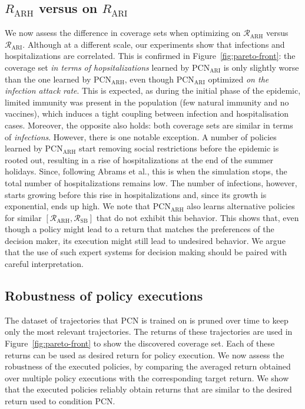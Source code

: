\documentclass{article}
\newcommand{\mdprewardfn}{\mathcal{R}}
\begin{document}
\subsection{$R_\text{ARH}$ versus on $R_\text{ARI}$}
\label{sec:arh-vs-ari}

We now assess the difference in coverage sets when optimizing on $\mdprewardfn_\text{ARH}$ versus $\mdprewardfn_\text{ARI}$. Although at a different scale, our experiments show that infections and hospitalizations are correlated. This is confirmed in Figure~\ref{fig:pareto-front}: the coverage set \emph{in terms of hopsitalizations} learned by $\text{PCN}_\text{ARI}$ is only slightly worse than the one learned by $\text{PCN}_\text{ARH}$, even though $\text{PCN}_\text{ARI}$ optimized \emph{on the infection attack rate}. This is expected, as during the initial phase of the epidemic, limited immunity was present in the population (few natural immunity and no vaccines), which induces a tight coupling between infection and hospitalisation cases. Moreover, the opposite also holds: both coverage sets are similar in terms of \emph{infections}. However, there is one notable exception. A number of policies learned by $\text{PCN}_\text{ARH}$ start removing social restrictions before the epidemic is rooted out, resulting in a rise of hospitalizations at the end of the summer holidays. Since, following Abrams et al., this is when the simulation stops, the total number of hospitalizations remains low. The number of infections, however, starts growing before this rise in hospitalizations and, since its growth is exponential, ends up high. We note that $\text{PCN}_\text{ARH}$ also learns alternative policies for similar $[\mdprewardfn_\text{ARH}, \mdprewardfn_\text{SB}]$ that do not exhibit this behavior. This shows that, even though a policy might lead to a return that matches the preferences of the decision maker, its execution might still lead to undesired behavior. We argue that the use of such expert systems for decision making should be paired with careful interpretation.

\subsection{Robustness of policy executions}
\label{sec:pcn-robustness}

The dataset of trajectories that PCN is trained on is pruned over time to keep only the most relevant trajectories. The returns of these trajectories are used in Figure~\ref{fig:pareto-front} to show the discovered coverage set. Each of these returns can be used as desired return for policy execution. We now assess the robustness of the executed policies, by comparing the averaged return obtained over multiple policy executions with the corresponding target return. We show that the executed policies reliably obtain returns that are similar to the desired return used to condition PCN.
\end{document}

